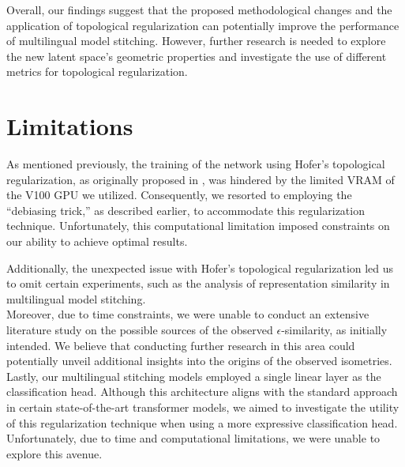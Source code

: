 \documentclass[../main.tex]{subfiles}
\begin{document}
Overall, our findings suggest that the proposed methodological changes and the application of topological regularization can potentially improve the performance of multilingual model stitching. However, further research is needed to explore the new latent space's geometric properties and investigate the use of different metrics for topological regularization.

\section{Limitations}
\label{sec:limitations}

As mentioned previously, the training of the network using Hofer's topological regularization, as originally proposed in \cite{hofer_densified_2021}, was hindered by the limited VRAM of the V100 GPU we utilized. Consequently, we resorted to employing the ``debiasing trick,'' as described earlier, to accommodate this regularization technique. Unfortunately, this computational limitation imposed constraints on our ability to achieve optimal results.

Additionally, the unexpected issue with Hofer's topological regularization led us to omit certain experiments, such as the analysis of representation similarity in multilingual model stitching.\\

Moreover, due to time constraints, we were unable to conduct an extensive literature study on the possible sources of the observed $\epsilon$-similarity, as initially intended. We believe that conducting further research in this area could potentially unveil additional insights into the origins of the observed isometries.\\

Lastly, our multilingual stitching models employed a single linear layer as the classification head. Although this architecture aligns with the standard approach in certain state-of-the-art transformer models, we aimed to investigate the utility of this regularization technique when using a more expressive classification head. Unfortunately, due to time and computational limitations, we were unable to explore this avenue.
\end{document}

